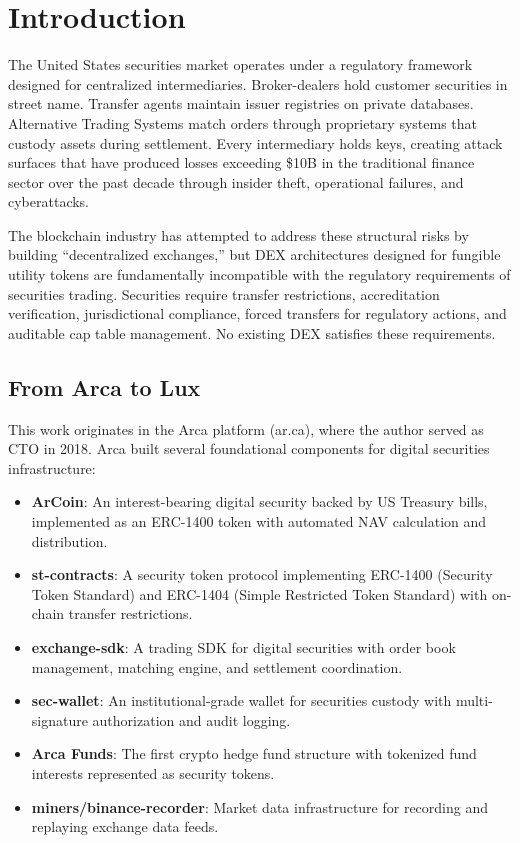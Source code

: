 \section{Introduction}


The United States securities market operates under a regulatory framework designed for centralized intermediaries. Broker-dealers hold customer securities in street name. Transfer agents maintain issuer registries on private databases. Alternative Trading Systems match orders through proprietary systems that custody assets during settlement. Every intermediary holds keys, creating attack surfaces that have produced losses exceeding \$10B in the traditional finance sector over the past decade through insider theft, operational failures, and cyberattacks.

The blockchain industry has attempted to address these structural risks by building ``decentralized exchanges,'' but DEX architectures designed for fungible utility tokens are fundamentally incompatible with the regulatory requirements of securities trading. Securities require transfer restrictions, accreditation verification, jurisdictional compliance, forced transfers for regulatory actions, and auditable cap table management. No existing DEX satisfies these requirements.

\subsection{From Arca to Lux}

This work originates in the Arca platform (ar.ca), where the author served as CTO in 2018. Arca built several foundational components for digital securities infrastructure:

\begin{itemize}[nosep]
  \item \textbf{ArCoin}: An interest-bearing digital security backed by US Treasury bills, implemented as an ERC-1400 token with automated NAV calculation and distribution.
  \item \textbf{st-contracts}: A security token protocol implementing ERC-1400 (Security Token Standard) and ERC-1404 (Simple Restricted Token Standard) with on-chain transfer restrictions.
  \item \textbf{exchange-sdk}: A trading SDK for digital securities with order book management, matching engine, and settlement coordination.
  \item \textbf{sec-wallet}: An institutional-grade wallet for securities custody with multi-signature authorization and audit logging.
  \item \textbf{Arca Funds}: The first crypto hedge fund structure with tokenized fund interests represented as security tokens.
  \item \textbf{miners/binance-recorder}: Market data infrastructure for recording and replaying exchange data feeds.
\end{itemize}


